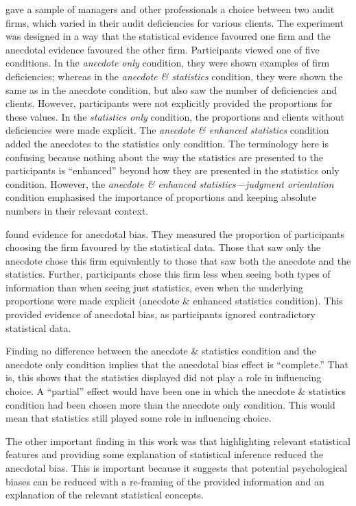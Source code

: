 \documentclass[a4paper, nobind, dvipsnames]{templates/ociamthesis}
\theoremstyle{definition}
\theoremstyle{definition}
\theoremstyle{definition}
\theoremstyle{definition}
\theoremstyle{remark}
\begin{document}
\textcite{wainberg2013} gave a sample of managers and other professionals a choice between
two audit firms, which varied in their audit deficiencies for various clients.
The experiment was designed in a way that the statistical evidence favoured one
firm and the anecdotal evidence favoured the other firm. Participants viewed one
of five conditions. In the \emph{anecdote only} condition, they were shown examples
of firm deficiencies; whereas in the \emph{anecdote \& statistics} condition, they
were shown the same as in the anecdote condition, but also saw the number of
deficiencies and clients. However, participants were not explicitly provided the
proportions for these values. In the \emph{statistics only} condition, the
proportions and clients without deficiencies were made explicit. The \emph{anecdote \&
enhanced statistics} condition added the anecdotes to the statistics only
condition. The terminology here is confusing because nothing about the way the
statistics are presented to the participants is ``enhanced'' beyond how they are
presented in the statistics only condition. However, the \emph{anecdote \& enhanced
statistics---judgment orientation} condition emphasised the importance of
proportions and keeping absolute numbers in their relevant context.

\textcite{wainberg2013} found evidence for anecdotal bias. They measured the proportion of
participants choosing the firm favoured by the statistical data. Those that saw
only the anecdote chose this firm equivalently to those that saw both the
anecdote and the statistics. Further, participants chose this firm less when
seeing both types of information than when seeing just statistics, even when the
underlying proportions were made explicit (anecdote \& enhanced statistics
condition). This provided evidence of anecdotal bias, as participants ignored
contradictory statistical data.

Finding no difference between the anecdote \& statistics condition and the
anecdote only condition implies that the anecdotal bias effect is ``complete.''
That is, this shows that the statistics displayed did not play a role in
influencing choice. A ``partial'' effect would have been one in which the anecdote
\& statistics condition had been chosen more than the anecdote only condition.
This would mean that statistics still played some role in influencing choice.

The other important finding in this work was that highlighting relevant
statistical features and providing some explanation of statistical inference
reduced the anecdotal bias. This is important because it suggests that potential
psychological biases can be reduced with a re-framing of the provided
information and an explanation of the relevant statistical concepts.
\end{document}
